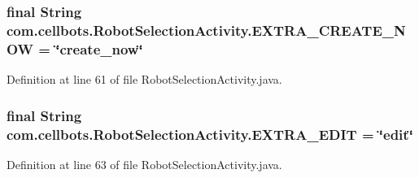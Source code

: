 \hypertarget{classcom_1_1cellbots_1_1_robot_selection_activity_a04e9a3abfaa019e43d09e1818437d85c}{
\subsubsection[{E\-X\-T\-R\-A\-\_\-\-C\-R\-E\-A\-T\-E\-\_\-\-N\-O\-W}]{\setlength{\rightskip}{0pt plus 5cm}final String {\bf com.\-cellbots.\-Robot\-Selection\-Activity.\-E\-X\-T\-R\-A\-\_\-\-C\-R\-E\-A\-T\-E\-\_\-\-N\-O\-W} = \char`\"{}create\-\_\-now\char`\"{}}}\label{classcom_1_1cellbots_1_1_robot_selection_activity_a04e9a3abfaa019e43d09e1818437d85c}


Definition at line 61 of file Robot\-Selection\-Activity.\-java.

\hypertarget{classcom_1_1cellbots_1_1_robot_selection_activity_a7503e169d09970fb21d02279571f3f43}{
\subsubsection[{E\-X\-T\-R\-A\-\_\-\-E\-D\-I\-T}]{\setlength{\rightskip}{0pt plus 5cm}final String {\bf com.\-cellbots.\-Robot\-Selection\-Activity.\-E\-X\-T\-R\-A\-\_\-\-E\-D\-I\-T} = \char`\"{}edit\char`\"{}}}\label{classcom_1_1cellbots_1_1_robot_selection_activity_a7503e169d09970fb21d02279571f3f43}


Definition at line 63 of file Robot\-Selection\-Activity.\-java.


